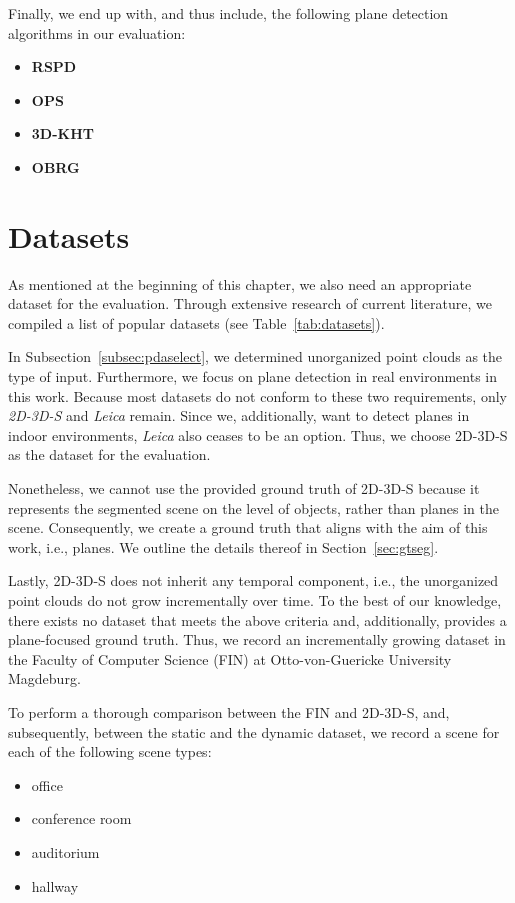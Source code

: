 \documentclass[main.tex]{subfiles}
\begin{document}
Finally, we end up with, and thus include, the following plane detection algorithms in our evaluation:

\begin{itemize}
    \item \textbf{RSPD}
    \item \textbf{OPS}
    \item \textbf{3D-KHT}
    \item \textbf{OBRG}
\end{itemize}

\section{Datasets}
As mentioned at the beginning of this chapter, we also need an appropriate dataset for the evaluation.
Through extensive research of current literature, we compiled a list of popular datasets (see Table~\ref{tab:datasets}).

In Subsection~\ref{subsec:pdaselect}, we determined unorganized point clouds as the type of input. Furthermore, we focus on plane detection in real environments in this work.
Because most datasets do not conform to these two requirements, only \textit{2D-3D-S} and \textit{Leica} remain. Since we, additionally, want to detect planes in indoor environments, 
\textit{Leica} also ceases to be an option. Thus, we choose 2D-3D-S as the dataset for the evaluation.

Nonetheless, we cannot use the provided ground truth of 2D-3D-S because it represents the segmented scene on the level of objects, rather than planes in the scene.
Consequently, we create a ground truth that aligns with the aim of this work, i.e., planes. We outline the details thereof in Section~\ref{sec:gtseg}.  

Lastly, 2D-3D-S does not inherit any temporal component, i.e., the unorganized point clouds do not grow incrementally over time. 
To the best of our knowledge, there exists no dataset that meets the above criteria and, additionally, provides a plane-focused ground truth. 
Thus, we record an incrementally growing dataset in the Faculty of Computer Science (FIN) at Otto-von-Guericke University Magdeburg.

To perform a thorough comparison between the FIN and 2D-3D-S, and, subsequently, between the static and the dynamic dataset, we record a scene for each of the following scene types:
\begin{itemize}
    \item office
    \item conference room
    \item auditorium
    \item hallway
\end{itemize}
\end{document}
